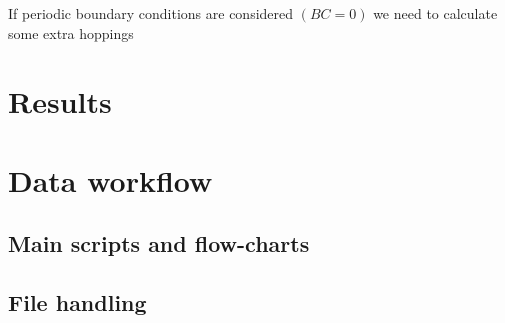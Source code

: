 \documentclass[paper=a4, fontsize=11pt]{scrartcl} %
\numberwithin{equation}{section} %
\numberwithin{figure}{section} %
\numberwithin{table}{section} %
\begin{document}
If periodic boundary conditions are considered $(BC=0)$ we need to calculate some extra hoppings



\newpage
\section{Results}




\newpage
\section{Data workflow}

\subsection{Main scripts and flow-charts}
\label{subsec:scripts}


\subsection{File handling}
\label{subsec:files}





\newpage

\end{document}
